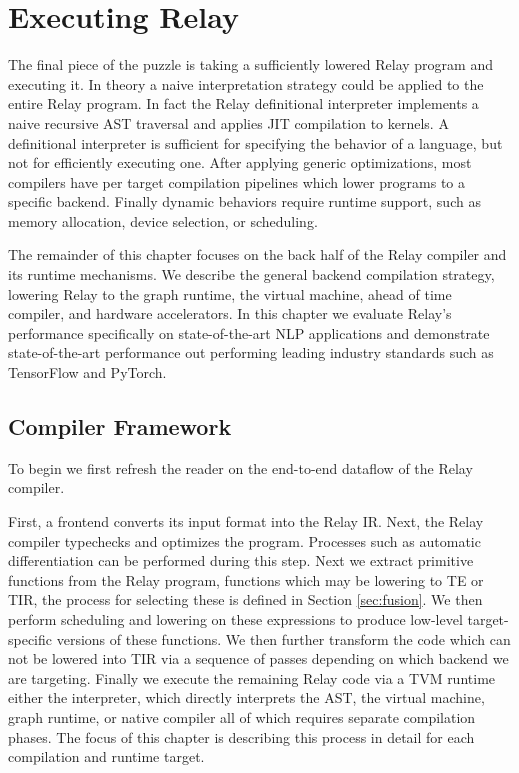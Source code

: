 \chapter{Executing Relay}
\label{ch:execute}

The final piece of the puzzle is taking a sufficiently
    lowered Relay program and executing it.
In theory a naive interpretation strategy could be applied
    to the entire Relay program.
In fact the Relay definitional interpreter
  implements a naive recursive AST traversal
  and applies JIT compilation to kernels.
A definitional interpreter is sufficient
  for specifying the behavior of a language,
  but not for efficiently executing one.
After applying generic optimizations,
  most compilers have per target compilation
  pipelines which lower programs to a specific
  backend.
Finally dynamic behaviors require
  runtime support, such as memory allocation,
  device selection, or scheduling.

The remainder of this chapter focuses on the back
  half of the Relay compiler and its runtime mechanisms.
We describe the general backend compilation strategy,
  lowering Relay to the graph runtime, the virtual machine,
  ahead of time compiler, and hardware accelerators.
In this chapter we evaluate Relay's performance specifically
  on state-of-the-art NLP applications and demonstrate
  state-of-the-art performance out performing leading industry standards
  such as TensorFlow and PyTorch.

\section{Compiler Framework}

To begin we first refresh the reader on the end-to-end
  dataflow of the Relay compiler.

First, a frontend converts its input format into the Relay IR.
Next, the Relay compiler typechecks and optimizes the program.
Processes such as automatic differentiation can be performed
  during this step.
Next we extract primitive functions
  from the Relay program, functions which may be lowering to TE or TIR,
  the process for selecting these
  is defined in Section \ref{sec:fusion}.
We then perform scheduling and lowering on these
  expressions to produce low-level target-specific versions
  of these functions.
We then further transform the code which can not be lowered
  into TIR via a sequence of passes depending on which backend
  we are targeting.
Finally we execute the remaining Relay code via a TVM runtime
  either the interpreter, which directly interprets the AST,
  the virtual machine, graph runtime, or native compiler all
  of which requires separate compilation phases.
The focus of this chapter is describing this process in
  detail for each compilation and runtime target.


